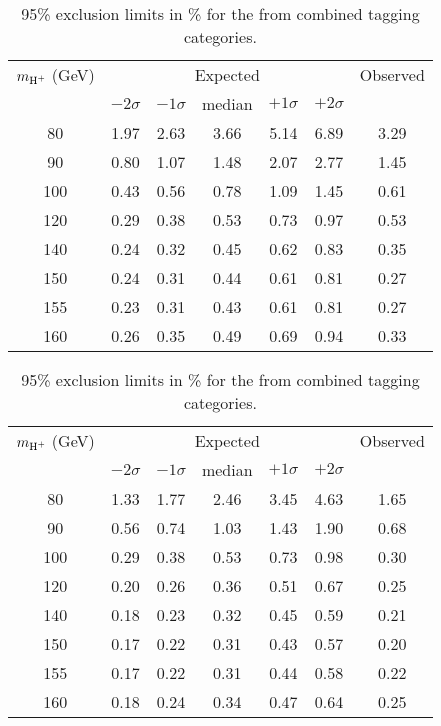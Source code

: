 \begin{table}
\caption{95\% \CL exclusion limits in \% for the \ejets from combined \PQc tagging categories.}
\label{tab:limit_electron}
\begin{center}
\begin{tabular}{ccccccc}
\hline
\hline
\multicolumn{1}{c}{$m_{\text{H}^+}$ (GeV)} & \multicolumn{5}{c}{{Expected}} & \multicolumn{1}{c}{{Observed}} \\
&\multicolumn{1}{c}{$-2\sigma$} &\multicolumn{1}{c}{$-1\sigma$} &\multicolumn{1}{c}{median} & \multicolumn{1}{c}{$+1\sigma$} & \multicolumn{1}{c}{$+2\sigma$}&\\ \hline
\hline
80  & 1.97 & 2.63 & 3.66 & 5.14 & 6.89 & 3.29\\
90  & 0.80 & 1.07 & 1.48 & 2.07 & 2.77 & 1.45\\
100 & 0.43 & 0.56 & 0.78 & 1.09 & 1.45 & 0.61\\
120 & 0.29 & 0.38 & 0.53 & 0.73 & 0.97 & 0.53\\
140 & 0.24 & 0.32 & 0.45 & 0.62 & 0.83 & 0.35\\
150 & 0.24 & 0.31 & 0.44 & 0.61 & 0.81 & 0.27\\
155 & 0.23 & 0.31 & 0.43 & 0.61 & 0.81 & 0.27\\
160 & 0.26 & 0.35 & 0.49 & 0.69 & 0.94 & 0.33\\
\hline
\end{tabular}
\end{center}
\end{table}

\begin{table}
\caption{95\% \CL exclusion limits in \% for the \ljets from combined \PQc tagging categories.}
\label{tab:limit_lepton}
\begin{center}
\begin{tabular}{ccccccc}
\hline
\hline
\multicolumn{1}{c}{$m_{\text{H}^+}$ (GeV)} & \multicolumn{5}{c}{{Expected}} & \multicolumn{1}{c}{{Observed}} \\
&\multicolumn{1}{c}{$-2\sigma$} &\multicolumn{1}{c}{$-1\sigma$} &\multicolumn{1}{c}{median} & \multicolumn{1}{c}{$+1\sigma$} & \multicolumn{1}{c}{$+2\sigma$}&\\ \hline
\hline
80  & 1.33 & 1.77 & 2.46 & 3.45 & 4.63 & 1.65\\
90  & 0.56 & 0.74 & 1.03 & 1.43 & 1.90 & 0.68\\
100 & 0.29 & 0.38 & 0.53 & 0.73 & 0.98 & 0.30\\
120 & 0.20 & 0.26 & 0.36 & 0.51 & 0.67 & 0.25\\
140 & 0.18 & 0.23 & 0.32 & 0.45 & 0.59 & 0.21\\
150 & 0.17 & 0.22 & 0.31 & 0.43 & 0.57 & 0.20\\
155 & 0.17 & 0.22 & 0.31 & 0.44 & 0.58 & 0.22\\
160 & 0.18 & 0.24 & 0.34 & 0.47 & 0.64 & 0.25\\
\hline
\end{tabular}
\end{center}
\end{table}
